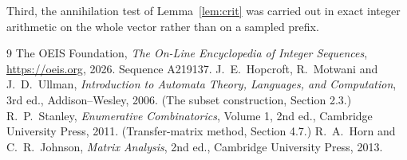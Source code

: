 \documentclass[11pt,a4paper]{article}
\theoremstyle{plain}
\theoremstyle{definition}
\begin{document}
Third, the annihilation test of Lemma~\ref{lem:crit} was carried out in exact integer
arithmetic on the whole vector rather than on a sampled prefix.

\begin{thebibliography}{9}
 The OEIS Foundation, \emph{The On-Line Encyclopedia of Integer
Sequences}, \url{https://oeis.org}, 2026. Sequence A219137.
 J.~E.~Hopcroft, R.~Motwani and J.~D.~Ullman, \emph{Introduction to Automata
Theory, Languages, and Computation}, 3rd ed., Addison--Wesley, 2006. (The subset
construction, Section 2.3.)
 R.~P.~Stanley, \emph{Enumerative Combinatorics}, Volume 1, 2nd ed.,
Cambridge University Press, 2011. (Transfer-matrix method, Section 4.7.)
 R.~A.~Horn and C.~R.~Johnson, \emph{Matrix Analysis}, 2nd ed., Cambridge
University Press, 2013.
\end{thebibliography}
\end{document}
